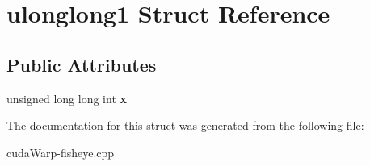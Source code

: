 \hypertarget{structulonglong1}{}\section{ulonglong1 Struct Reference}
\label{structulonglong1}
\subsection*{Public Attributes}
\begin{DoxyCompactItemize}
\item 
unsigned long long int {\bfseries x}\hypertarget{structulonglong1_a5408f3d3c49703554cd422b299c6bbf4}{}\label{structulonglong1_a5408f3d3c49703554cd422b299c6bbf4}

\end{DoxyCompactItemize}


The documentation for this struct was generated from the following file\+:\begin{DoxyCompactItemize}
\item 
cuda\+Warp-\/fisheye.\+cpp\end{DoxyCompactItemize}
